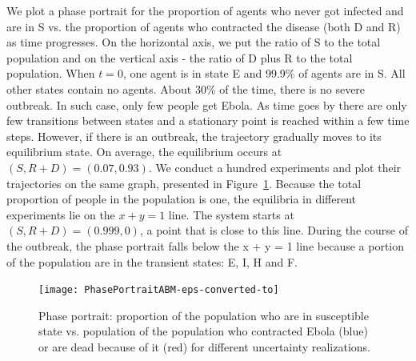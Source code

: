 
We plot a phase portrait for the proportion of agents who never got infected and are in S vs. the proportion of agents who contracted the disease (both D and R) as time progresses. On the horizontal axis, we put the ratio of S to the total population and on the vertical axis - the ratio of D plus R to the total population.  When $t = 0$, one agent is in state E and 99.9\% of agents are in S. All other states contain no agents. About 30\% of the time, there is no severe outbreak. In such case, only few people get Ebola. As time goes by there are only few transitions between states and a stationary point is reached within a few time steps. However, if there is an outbreak, the trajectory gradually moves to its equilibrium state. On average, the equilibrium occurs at $(S, R+ D) = (0.07, 0.93)$. We conduct a hundred experiments and plot their trajectories on the same graph, presented in Figure~\ref{fig:PhasePortraitAbm}. Because the total proportion of people in the population is one, the equilibria in different experiments lie on the $x + y = 1$ line. The system starts at $(S, R+D) = (0.999, 0)$, a point that is close to this line. During the course of the outbreak, the phase portrait falls below the x + y = 1 line because a portion of the population are in the transient states: E, I, H and F. 

%
\begin{figure}[h!]
\begin{center}
\texttt{[image: PhasePortraitABM-eps-converted-to]}
\end{center}
\caption{Phase portrait: proportion of the population who are in susceptible state vs. population of the population who contracted Ebola (blue) or are dead because of it (red) for different uncertainty realizations.}
\label{fig:PhasePortraitAbm}
\end{figure}



